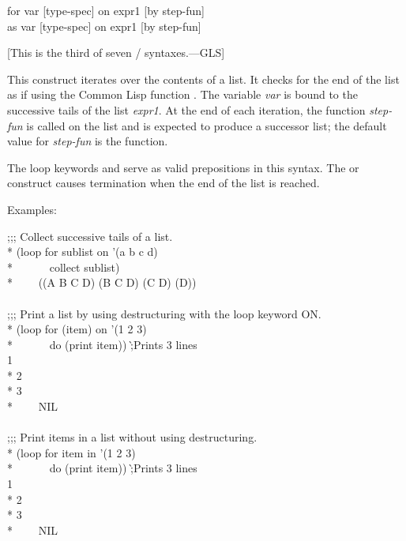 \begin{defloop}
for var [type-spec] on expr1 [by step-fun] \\
as var [type-spec] on expr1 [by step-fun]

[This is the third of seven / syntaxes.---GLS]

This construct iterates over the contents of a list. It checks for the
end of the list as if using the Common Lisp function 
.  
The variable \emph{var\/} is bound to the successive tails of the list
\emph{expr1}.  At the end of each iteration, the function \emph{step-fun\/}
is called on the list and is expected to produce a successor list;
the default value for \emph{step-fun\/} is the  function.

The loop keywords  and  serve as valid
prepositions in this syntax.
The  or  construct causes termination when the
end of the list is reached.

Examples:
\begin{lisp}
;;; Collect successive tails of a list. \\*
(loop for sublist on '(a b c d) \\*
~~~~~~collect sublist) \\*
~~~\EV~((A B C D) (B C D) (C D) (D)) \\
 \\
;;; Print a list by using destructuring with the loop keyword ON. \\*
(loop for (item) on '(1 2 3) \\*
~~~~~~do (print item))  \`;\textrm{Prints 3 lines}\\
1  \\*
2  \\*
3  \\*
~~~\EV~NIL \\
 \\
;;; Print items in a list without using destructuring. \\*
(loop for item in '(1 2 3) \\*
~~~~~~do (print item))  \`;\textrm{Prints 3 lines}\\
1  \\*
2  \\*
3  \\*
~~~\EV~NIL
\end{lisp}
\end{defloop}

